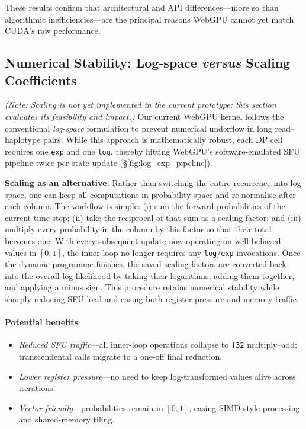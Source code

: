 \documentclass[PhD]{PHlab-thesis}
\begin{document}
These results confirm that architectural and API differences—more so than algorithmic inefficiencies—are the principal reasons WebGPU cannot yet match CUDA's raw performance.


\subsection{Numerical Stability: Log-space \emph{versus} Scaling Coefficients}
\textit{(Note: Scaling is not yet implemented in the current prototype; this
section evaluates its feasibility and impact.)}
Our current WebGPU kernel follows the conventional \emph{log-space} formulation
to prevent numerical underflow in long read–haplotype pairs.
While this approach is mathematically robust, each DP cell requires one
\texttt{exp} and one \texttt{log}, thereby hitting WebGPU's software-emulated
SFU pipeline twice per state update (§\ref{fig:log_exp_pipeline}).

\vspace{0.4em}
\noindent\textbf{Scaling as an alternative.}\;
Rather than switching the entire recurrence into log space, one can keep all
computations in probability space and re-normalise after each column.  The
workflow is simple: (i) sum the forward probabilities of the current time
step; (ii) take the reciprocal of that sum as a scaling factor; and
(iii) multiply every probability in the column by this factor so that their
total becomes one.  With every subsequent update now operating on well-behaved
values in \([0,1]\), the inner loop no longer requires any
\texttt{log}/\texttt{exp} invocations.  Once the dynamic programme finishes,
the saved scaling factors are converted back into the overall log-likelihood
by taking their logarithms, adding them together, and applying a minus sign.
This procedure retains numerical stability while sharply reducing SFU load
and easing both register pressure and memory traffic.

\paragraph{Potential benefits}
\begin{itemize}
  \item \emph{Reduced SFU traffic}––all inner-loop
        operations collapse to \texttt{f32} multiply–add; transcendental calls
        migrate to a one-off final reduction.
  \item \emph{Lower register pressure}––no need to keep log-transformed values
        alive across iterations.
  \item \emph{Vector-friendly}––probabilities remain in \([0,1]\),
        easing SIMD-style processing and shared-memory tiling.
\end{itemize}
\end{document}
